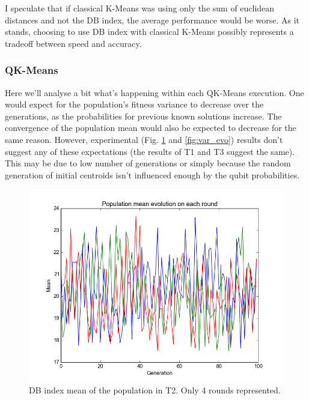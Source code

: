 \documentclass[12pt,a4paper,final]{article}
\begin{document}
I speculate that if classical K-Means was using only the sum of euclidean distances and not the DB index, the average performance would be worse. As it stands, choosing to use DB index with classical K-Means possibly represents a tradeoff between speed and accuracy.

\subsubsection{QK-Means}

Here we'll analyse a bit what's happening within each QK-Means execution. One would expect for the population's fitness variance to decrease over the generations, as the probabilities for previous known solutions increase. The convergence of the population mean would also be expected to decrease for the same reason. However, experimental (Fig. \ref{fig:mean_evo} and \ref{fig:var_evo}) results don't suggest any of these expectations (the results of T1 and T3 suggest the same). This may be due to low number of generations or simply because the random generation of initial centroids isn't influenced enough by the qubit probabilities.

\begin{figure}[hbtp]
\centering
\includegraphics[scale=0.6]{bi_nofactor_mean.png}
\caption{DB index mean of the population in T2. Only 4 rounds represented.}
\label{fig:mean_evo}
\end{figure}
\end{document}
